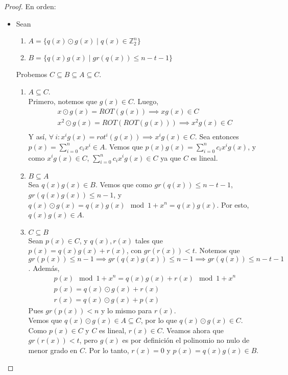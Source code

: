 \begin{proof}
En orden:
\begin{itemize}
    \item Sean
    \begin{enumerate}
        \item $A = \{ q(x) \odot g(x) \mid q(x) \in \mathbb{Z}_2^n\}$ 
        \item $B = \{ q(x)g(x) \mid gr(q(x)) \le n - t - 1 \}$ 
    \end{enumerate}
    Probemos $C \subseteq B \subseteq A \subseteq C$.
    \begin{enumerate}
        \item $A \subseteq C$.\\
        Primero, notemos que $g(x) \in C$. Luego,
        \begin{align}
            x \odot g(x) = ROT(g(x)) \implies x g(x) \in C\\
            x^2 \odot g(x) = ROT(ROT(g(x))) \implies x^2 g(x) \in C\\
        \end{align}
        Y así, $\forall~ i : x^ig(x) = rot^i(g(x)) \implies x^i g(x) \in C$. Sea entonces $p(x) = \sum_{i=0}^n c_ix^i \in A$. Vemos que $p(x)g(x) = \sum_{i=0}^n c_ix^ig(x)$, y como $x^ig(x) \in C$, $\sum_{i=0}^n c_ix^ig(x) \in C$ ya que $C$ es lineal.
        \item $B \subseteq A$\\
        Sea $q(x)g(x) \in B$. Vemos que como $gr(q(x)) \le n - t - 1$, $gr(q(x)g(x)) \le n - 1$, y $q(x) \odot g(x) = q(x)g(x) \mod 1+x^n = q(x)g(x)$. Por esto, $q(x)g(x) \in A$.
        \item $C \subseteq B$\\
        Sean $p(x) \in C$, y $q(x), r(x)$ tales que $p(x) = q(x)g(x) + r(x)$, con $gr(r(x)) < t$. Notemos que $gr(p(x)) \le n - 1 \implies gr(q(x)g(x)) \le n - 1 \implies gr(q(x)) \le n - t -1$. Además,
        \begin{align}
            p(x) \mod{1+x^n} = q(x)g(x) + r(x) \mod{1+x^n}\\
            p(x) = q(x) \odot g(x) + r(x)\\
            r(x) = q(x) \odot g(x) + p(x)
        \end{align}
        Pues $gr(p(x)) < n$ y lo mismo para $r(x)$.\\
        Vemos que $q(x) \odot g(x) \in A \subseteq C$, por lo que $q(x) \odot g(x) \in C$. Como $p(x) \in C$ y $C$ es lineal, $r(x) \in C$. Veamos ahora que $gr(r(x)) < t$, pero $g(x)$ es por definición el polinomio no nulo de menor grado en $C$. Por lo tanto, $r(x) = 0$ y $p(x) = q(x)g(x) \in B$.

\end{enumerate}
\end{itemize}
\end{proof}
